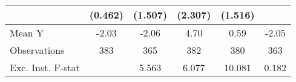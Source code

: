 {\begin{tabular}{l*{5}{c}}
            &     (0.462)         &     (1.507)         &     (2.307)         &     (1.516)         &                     \\
\midrule
Mean Y      &       -2.03         &       -2.06         &        4.70         &        0.59         &       -2.05         \\
Observations&         383         &         365         &         382         &         380         &         363         \\
Exc. Inst. F-stat&                     &       5.563         &       6.077         &      10.081         &       0.182         \\
\bottomrule
\end{tabular}
}
